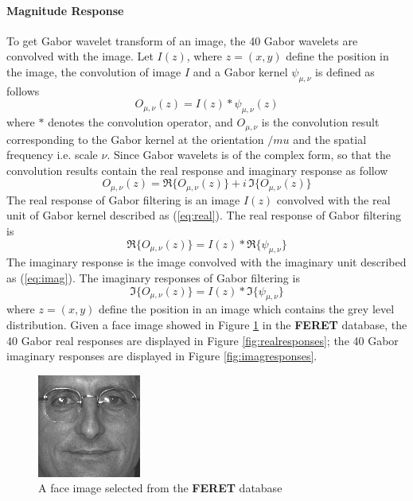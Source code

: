 \paragraph{Magnitude Response} 
To get Gabor wavelet transform of an image, the 40 Gabor wavelets are convolved with the image. Let $I(z)$, where $z=(x,y)$ define the position in the image, the convolution of image $I$ and a Gabor kernel $\psi_{\mu,\nu}$ is defined as follows
\begin{equation}\label{eq:conv}
 O_{\mu,\nu}(z)=I(z)\ast\psi_{\mu,\nu}(z)
\end{equation}
where $*$ denotes the convolution operator, and $O_{\mu,\nu}$ is the convolution result corresponding to the Gabor kernel at the orientation $/mu$ and the spatial frequency i.e. scale $\nu$.
Since Gabor wavelets is of the complex form, so that the convolution results contain the real response and imaginary response as follow
\begin{displaymath}
 O_{\mu,\nu}(z) = \Re\{O_{\mu,\nu}(z)\} +i\,\Im\{O_{\mu,\nu}(z)\}
\end{displaymath}
The real response of Gabor filtering is an image $I(z)$ convolved with the real unit of Gabor kernel described as (\ref{eq:real}). The real response of Gabor filtering is 
\begin{equation}
 \Re\{O_{\mu,\nu}(z)\} = I(z) *  \Re\{\psi_{\mu,\nu}\}
\end{equation}
The imaginary response is the image convolved with the imaginary unit described as (\ref{eq:imag}). The imaginary responses of Gabor filtering is 
\begin{equation}
 \Im\{O_{\mu,\nu}(z)\} = I(z) *  \Im\{\psi_{\mu,\nu}\}
\end{equation}
where $z = (x,y)$ define the position in an image which contains the grey level distribution. Given a face image showed in \mbox{Figure} \ref{fig:afaceimage} in the \textbf{FERET} database, the 40 Gabor real responses are displayed in \mbox{Figure} \ref{fig:realresponses}; the 40 Gabor imaginary responses are displayed in \mbox{Figure} \ref{fig:imagresponses}.
\begin{figure}
 \begin{center}
   \includegraphics[scale=0.75]{ch4/figures/FERET.jpg}
   \caption{A face image selected from the \textbf{FERET} database}
   \label{fig:afaceimage}
 \end{center}
\end{figure} 

